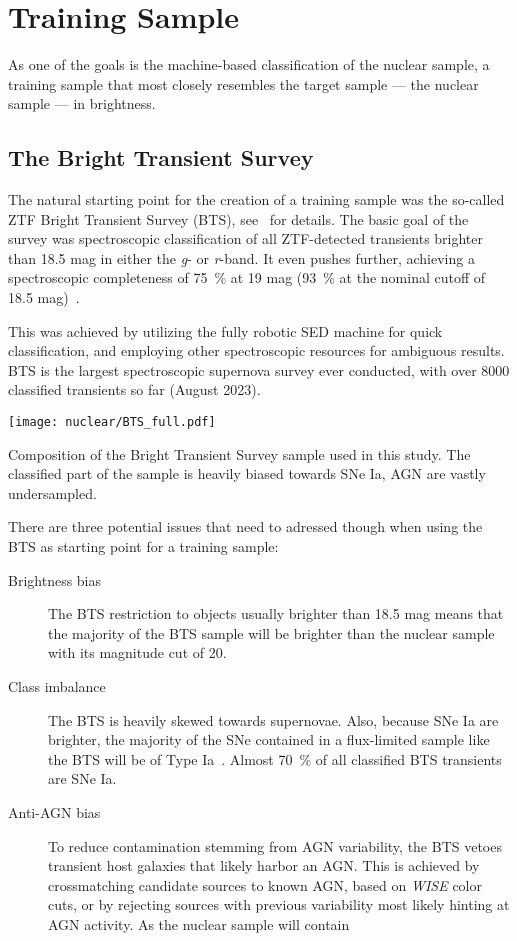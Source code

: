 \section{Training Sample}
As one of the goals is the machine-based classification of the nuclear sample, a training sample that most closely resembles the target sample --- the nuclear sample --- in brightness.

\subsection{The Bright Transient Survey}\label{bts}
The natural starting point for the creation of a training sample was the so-called ZTF Bright Transient Survey (BTS), see~\cite{Fremling2020,Perley2020} for details. The basic goal of the survey was spectroscopic classification of all ZTF-detected transients brighter than 18.5 mag in either the \textit{g}- or \textit{r}-band. It even pushes further, achieving a spectroscopic completeness of \SI{75}{\percent} at 19 mag (\SI{93}{\percent} at the nominal cutoff of 18.5 mag)~\cite{Perley2020}.

This was achieved by utilizing the fully robotic SED machine for quick classification, and employing other spectroscopic resources for ambiguous results. BTS is the largest spectroscopic supernova survey ever conducted, with over 8000 classified transients so far (August 2023).

\begin{marginfigure}
    \texttt{[image: nuclear/BTS\_full.pdf]}
    \caption[BTS Composition]{Composition of the Bright Transient Survey sample used in this study. The classified part of the sample is heavily biased towards SNe Ia, AGN are vastly undersampled.}
\end{marginfigure}

There are three potential issues that need to adressed though when using the BTS as starting point for a training sample:

\begin{description}
    \item[Brightness bias] The BTS restriction to objects usually brighter than 18.5 mag means that the majority of the BTS sample will be brighter than the nuclear sample with its magnitude cut of 20.
    \item[Class imbalance] The BTS is heavily skewed towards supernovae. Also, because SNe Ia are brighter, the majority of the SNe contained in a flux-limited sample like the BTS will be of Type Ia~\cite{Perley2020}. Almost \SI{70}{\percent} of all classified BTS transients are SNe Ia.
    \item[Anti-AGN bias] To reduce contamination stemming from AGN variability, the BTS vetoes transient host galaxies that likely harbor an AGN. This is achieved by crossmatching candidate sources to known AGN, based on \textit{WISE} color cuts, or by rejecting sources with previous variability most likely hinting at AGN activity. As the nuclear sample will contain
\end{description}

